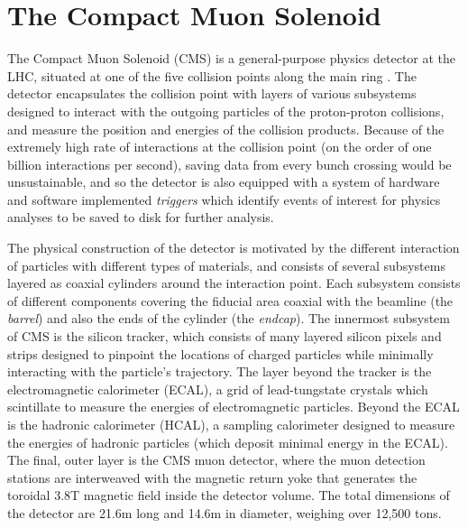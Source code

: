 \section{The Compact Muon Solenoid}
\label{sec:cms}
The Compact Muon Solenoid (CMS) is a general-purpose physics detector at the LHC, situated at one of the five collision points along the main ring \cite{Chatrchyan:2008aa, Bayatian:2006nff}. The detector encapsulates the collision point with layers of various subsystems designed to interact with the outgoing particles of the proton-proton collisions, and measure the position and energies of the collision products. Because of the extremely high rate of interactions at the collision point (on the order of one billion interactions per second), saving data from every bunch crossing would be unsustainable, and so the detector is also equipped with a system of hardware and software implemented {\it triggers} which identify events of interest for physics analyses to be saved to disk for further analysis.

The physical construction of the detector is motivated by the different interaction of particles with different types of materials, and consists of several subsystems layered as coaxial cylinders around the interaction point. Each subsystem consists of different components covering the fiducial area coaxial with the beamline (the {\it barrel}) and also the ends of the cylinder (the {\it endcap}). The innermost subsystem of CMS is the silicon tracker, which consists of many layered silicon pixels and strips designed to pinpoint the locations of charged particles while minimally interacting with the particle's trajectory. The layer beyond the tracker is the electromagnetic calorimeter (ECAL), a grid of lead-tungstate crystals which scintillate to measure the energies of electromagnetic particles. Beyond the ECAL is the hadronic calorimeter (HCAL), a sampling calorimeter designed to measure the energies of hadronic particles (which deposit minimal energy in the ECAL). The final, outer layer is the CMS muon detector, where the muon detection stations are interweaved with the magnetic return yoke that generates the toroidal 3.8T magnetic field inside the detector volume. The total dimensions of the detector are 21.6m long and 14.6m in diameter, weighing over 12,500 tons.

